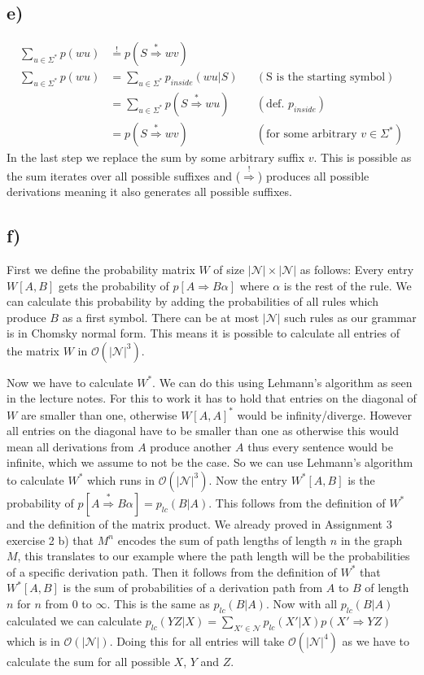 \documentclass[a4paper,12pt]{ETHexercise}
\begin{document}
\subsection*{e)}
\begin{align}
    \sum_{u \in \Sigma^*}p(wu) &\stackrel{!}{=} p(S \stackrel{*}{\Rightarrow} wv)\\
    \sum_{u \in \Sigma^*}p(wu) &= \sum_{u \in \Sigma^*} p_{inside}(wu|S) &&(\text{S is the starting symbol})\\
    &= \sum_{u \in \Sigma^*} p(S \stackrel{*}{\Rightarrow} wu) &&(\text{def. }p_{inside})\\
    &= p(S \stackrel{*}{\Rightarrow} wv) &&(\text{for some arbitrary }v \in \Sigma^*)
\end{align}
In the last step we replace the sum by some arbitrary suffix $v$. This is possible as the sum iterates over all possible suffixes and ($\stackrel{!}{\Rightarrow}$) produces all possible derivations meaning it also generates all possible suffixes.

\subsection*{f)}
First we define the probability matrix $W$ of size $|\mathcal{N}| \times |\mathcal{N}|$ as follows: Every entry $W[A,B]$ gets the probability of $p[A \Rightarrow B\alpha]$ where $\alpha$ is the rest of the rule. We can calculate this probability by adding the probabilities of all rules which produce $B$ as a first symbol. There can be at most $|\mathcal{N}|$ such rules as our grammar is in Chomsky normal form.
This means it is possible to calculate all entries of the matrix $W$ in $\mathcal{O}(|\mathcal{N}|^3)$.

Now we have to calculate $W^*$. We can do this using Lehmann's algorithm as seen in the lecture notes. For this to work it has to hold that entries on the diagonal of $W$ are smaller than one, otherwise $W[A,A]^*$ would be infinity/diverge. However all entries on the diagonal have to be smaller than one as otherwise this would mean all derivations from $A$ produce another $A$ thus every sentence would be infinite, which we assume to not be the case. So we can use Lehmann's algorithm to calculate $W^*$ which runs in $\mathcal{O}(|\mathcal{N}|^3)$.
Now the entry $W^*[A,B]$ is the probability of $p[A  \stackrel{*}{\Rightarrow} B\alpha] = p_{lc}(B|A)$. This follows from the definition of $W^*$ and the definition of the matrix product. We already proved in Assignment 3 exercise 2 b) that $M^n$ encodes the sum of path lengths of length $n$ in the graph $M$, this translates to our example where the path length will be the probabilities of a specific derivation path.
Then it follows from the definition of $W^*$ that $W^*[A,B]$ is the sum of probabilities of a derivation path from $A$ to $B$ of length $n$ for $n$ from $0$ to $\infty$. This is the same as $p_{lc}(B|A)$.
Now with all $p_{lc}(B|A)$ calculated we can calculate $p_{lc}(YZ|X) = \sum_{X' \in \mathcal{N}} p_{lc}(X'|X)p(X' \Rightarrow YZ)$ which is in $\mathcal{O}(|\mathcal{N}|)$. Doing this for all entries will take $\mathcal{O}(|\mathcal{N}|^4)$ as we have to calculate the sum for all possible $X$, $Y$ and $Z$.
\end{document}
